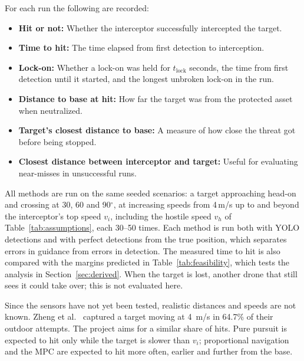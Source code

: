 For each run the following are recorded:

\begin{itemize}
    \item \textbf{Hit or not:} Whether the interceptor successfully intercepted the target.
    \item \textbf{Time to hit:} The time elapsed from first detection to interception.
    \item \textbf{Lock-on:} Whether a lock-on was held for $t_{\mathrm{lock}}$ seconds, the time from first detection until it started, and the longest unbroken lock-on in the run.
    \item \textbf{Distance to base at hit:} How far the target was from the protected asset when neutralized.
    \item \textbf{Target's closest distance to base:} A measure of how close the threat got before being stopped.
    \item \textbf{Closest distance between interceptor and target:} Useful for evaluating near-misses in unsuccessful runs.
\end{itemize}

All methods are run on the same seeded scenarios: a target approaching
head-on and crossing at 30, 60 and 90$^\circ$, at increasing speeds from
4\,m/s up to and beyond the interceptor's top speed $v_i$, including the
hostile speed $v_h$ of Table~\ref{tab:assumptions}, each 30--50 times. Each
method is run both with YOLO detections and with perfect detections from the
true position, which separates errors in guidance from errors in detection.
The measured time to hit is also compared with the margins predicted in
Table~\ref{tab:feasibility}, which tests the analysis in
Section~\ref{sec:derived}. When the target is lost, another drone that still
sees it could take over; this is not evaluated here.

Since the sensors have not yet been tested, realistic distances and speeds
are not known. Zheng et al.\ \cite{zheng2025mcm} captured a target moving at
4~m/s in 64.7\% of their outdoor attempts. The project aims for a similar
share of hits. Pure pursuit is expected to hit only while the target is
slower than $v_i$; proportional navigation and the MPC are expected to hit
more often, earlier and further from the base.